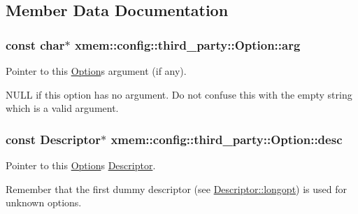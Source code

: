 \subsection{Member Data Documentation}
\hypertarget{classxmem_1_1config_1_1third__party_1_1_option_a409f63d66d900e594dd86bcdfa9fd86a}{}
\subsubsection[{arg}]{\setlength{\rightskip}{0pt plus 5cm}const char$\ast$ xmem\+::config\+::third\+\_\+party\+::\+Option\+::arg}\label{classxmem_1_1config_1_1third__party_1_1_option_a409f63d66d900e594dd86bcdfa9fd86a}


Pointer to this \hyperlink{classxmem_1_1config_1_1third__party_1_1_option}{Option}\textquotesingle{}s argument (if any). 

N\+U\+L\+L if this option has no argument. Do not confuse this with the empty string which is a valid argument. \hypertarget{classxmem_1_1config_1_1third__party_1_1_option_a561317d9c847dee40c9da4a1c2065d8a}{}
\subsubsection[{desc}]{\setlength{\rightskip}{0pt plus 5cm}const {\bf Descriptor}$\ast$ xmem\+::config\+::third\+\_\+party\+::\+Option\+::desc}\label{classxmem_1_1config_1_1third__party_1_1_option_a561317d9c847dee40c9da4a1c2065d8a}


Pointer to this \hyperlink{classxmem_1_1config_1_1third__party_1_1_option}{Option}\textquotesingle{}s \hyperlink{structxmem_1_1config_1_1third__party_1_1_descriptor}{Descriptor}. 

Remember that the first dummy descriptor (see \hyperlink{structxmem_1_1config_1_1third__party_1_1_descriptor_a7246a4bfc669f68bb406dece398be7bb}{Descriptor\+::longopt}) is used for unknown options.

